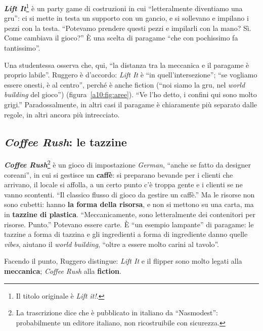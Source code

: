 

\textbf{\emph{Lift It}}\footnote{Il titolo originale è \emph{Lift it!}.} è un party game
di costruzioni in cui ``letteralmente diventiamo una gru'': ci si mette in testa un
supporto con un gancio, e si sollevano e impilano i pezzi con la testa. ``Potevamo
prendere questi pezzi e impilarli con la mano? Sì. Come cambiava il gioco?'' È una scelta
di paragame ``che con pochissimo fa tantissimo''.

Una studentessa osserva che, qui, ``la distanza tra la meccanica e il paragame è proprio
labile''. Ruggero è d'accordo: \emph{Lift It} è ``in quell'intersezione''; ``se vogliamo
essere onesti, è al centro'', perché è anche fiction (``noi siamo la gru, nel
\emph{world building} del gioco'') (figura~\ref{a10:fig:aree}). ``Ve l'ho detto, i
confini qui sono molto grigi.'' Paradossalmente, in altri casi il paragame è
chiaramente più separato dalle regole, in altri ancora più intrecciato.

\subsection{\emph{Coffee Rush}: le tazzine}



\textbf{\emph{Coffee Rush}}\footnote{La trascrizione dice che è pubblicato in italiano da ``Nasmodest'':
probabilmente un editore italiano, non ricostruibile con sicurezza.} è un gioco di
impostazione \emph{German}, ``anche se fatto da designer coreani'', in cui si gestisce
un \textbf{caffè}: si preparano bevande per i clienti che arrivano, il locale si
affolla, a un certo punto c'è troppa gente e i clienti se ne vanno scontenti. ``Il
classico flusso di gioco da gestire un caffè.'' Ma le risorse non sono cubetti: hanno
\textbf{la forma della risorsa}, e non si mettono su una carta, ma in \textbf{tazzine di
plastica}. ``Meccanicamente, sono letteralmente dei contenitori per risorse. Punto.''
Potevano essere carte. È ``un esempio lampante'' di paragame: le tazzine a forma di
tazzina e gli ingredienti a forma di ingrediente danno quelle \emph{vibes}, aiutano il
\emph{world building}, ``oltre a essere molto carini al tavolo''.

Facendo il punto, Ruggero distingue: \emph{Lift It} e il flipper sono molto legati alla
\textbf{meccanica}; \emph{Coffee Rush} alla \textbf{fiction}.

